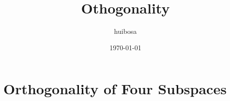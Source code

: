 \documentclass{article}
\title{Othogonality}
\author{huibosa}
\date{\today}
\begin{document}
\maketitle
\tableofcontents
\newpage

\section{Orthogonality of Four Subspaces}
\end{document}
